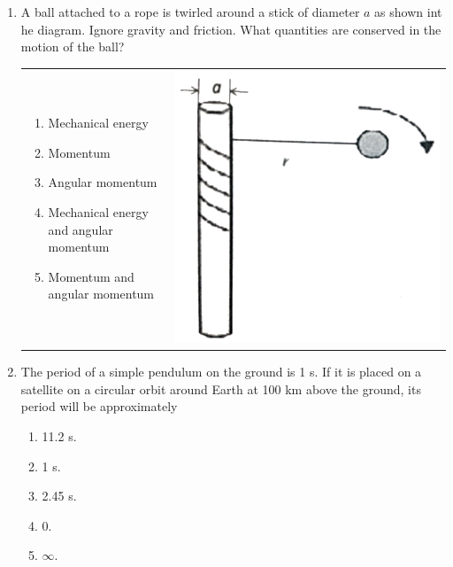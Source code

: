 \documentclass[12pt,letterpaper]{article}
\begin{document}
\begin{enumerate}
\item
A ball attached to a rope is twirled around a stick of diameter $a$ as shown int he diagram. Ignore gravity and friction. What quantities are conserved in the motion of the ball?

\begin{tabular}{l r}

\begin{minipage}{0.6\textwidth}
\begin{enumerate}
\item Mechanical energy
\item Momentum
\item Angular momentum
\item Mechanical energy and angular momentum
\item Momentum and angular momentum
\end{enumerate}
\end{minipage} &
\begin{minipage}{0.3\textwidth}
\includegraphics[width=\textwidth]{twirl.png}
\end{minipage}
\end{tabular}

\item
The period of a simple pendulum on the ground is 1 s. If it is placed on a satellite on a circular orbit around Earth at 100 km above the ground, its period will be approximately
\begin{enumerate}
\item 11.2 s.
\item 1 s.
\item 2.45 s.
\item 0.
\item $\infty$.
\end{enumerate}


\end{enumerate}
\end{document}
